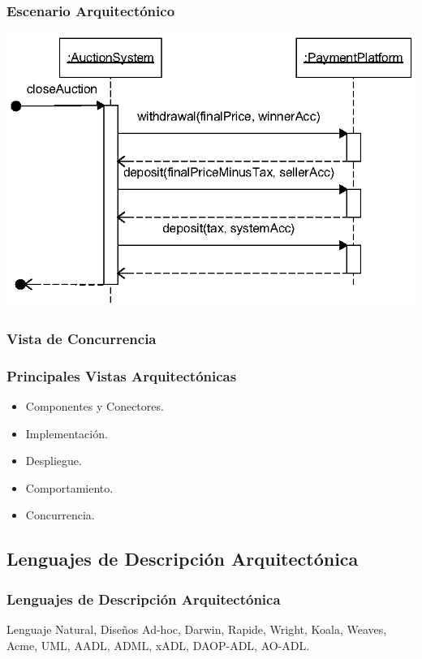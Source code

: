 ﻿\documentclass[handout,a4paper,slidestop,xcolor=pst,blue]{beamer}
\begin{document}
\begin{frame}[c]
	\frametitle{Escenario Arquitectónico}
	\begin{center}
		\includegraphics[width=.65\linewidth]{images/architecturalViews/scenario.eps}
	\end{center}
\end{frame}

\subsubsection{Vista de Concurrencia}

\begin{frame}[c]
	\frametitle{Principales Vistas Arquitectónicas}
	\begin{itemize}
		\item Componentes y Conectores.
        \item Implementación.
		\item Despliegue.
		\item Comportamiento.
		\item \alert{Concurrencia}.
	\end{itemize}
\end{frame}


\subsection{Lenguajes de Descripción Arquitectónica}

\begin{frame}[c]
	\frametitle{Lenguajes de Descripción Arquitectónica}
	Lenguaje Natural, \alert<2>{Diseños Ad-hoc}, Darwin, Rapide, Wright, Koala, Weaves, Acme, UML, \alert<2>{AADL}, ADML, xADL, DAOP-ADL, AO-ADL.
\end{frame}

\end{document}
